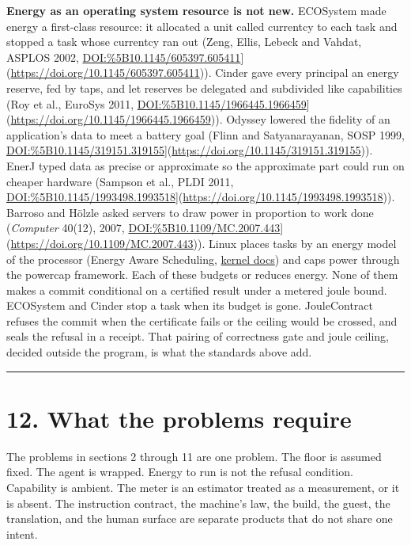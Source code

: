 \documentclass[10pt,letterpaper]{article}
\begin{document}
\textbf{Energy as an operating system resource is not new.} ECOSystem
made energy a first-class resource: it allocated a unit called currentcy
to each task and stopped a task whose currentcy ran out (Zeng, Ellis,
Lebeck and Vahdat, ASPLOS 2002,
\url{DOI:\%5B10.1145/605397.605411}{]}(\url{https://doi.org/10.1145/605397.605411})).
Cinder gave every principal an energy reserve, fed by taps, and let
reserves be delegated and subdivided like capabilities (Roy et al.,
EuroSys 2011,
\url{DOI:\%5B10.1145/1966445.1966459}{]}(\url{https://doi.org/10.1145/1966445.1966459})).
Odyssey lowered the fidelity of an application's data to meet a battery
goal (Flinn and Satyanarayanan, SOSP 1999,
\url{DOI:\%5B10.1145/319151.319155}{]}(\url{https://doi.org/10.1145/319151.319155})).
EnerJ typed data as precise or approximate so the approximate part could
run on cheaper hardware (Sampson et al., PLDI 2011,
\url{DOI:\%5B10.1145/1993498.1993518}{]}(\url{https://doi.org/10.1145/1993498.1993518})).
Barroso and Hölzle asked servers to draw power in proportion to work
done (\emph{Computer} 40(12), 2007,
\url{DOI:\%5B10.1109/MC.2007.443}{]}(\url{https://doi.org/10.1109/MC.2007.443})).
Linux places tasks by an energy model of the processor (Energy Aware
Scheduling,
\href{https://docs.kernel.org/scheduler/sched-energy.html}{kernel docs})
and caps power through the powercap framework. Each of these budgets or
reduces energy. None of them makes a commit conditional on a certified
result under a metered joule bound. ECOSystem and Cinder stop a task
when its budget is gone. JouleContract refuses the commit when the
certificate fails or the ceiling would be crossed, and seals the refusal
in a receipt. That pairing of correctness gate and joule ceiling,
decided outside the program, is what the standards above add.

\begin{center}\rule{0.5\linewidth}{0.5pt}\end{center}

\section{12. What the problems require}\label{what-the-problems-require}

The problems in sections 2 through 11 are one problem. The floor is
assumed fixed. The agent is wrapped. Energy to run is not the refusal
condition. Capability is ambient. The meter is an estimator treated as a
measurement, or it is absent. The instruction contract, the machine's
law, the build, the guest, the translation, and the human surface are
separate products that do not share one intent.
\end{document}
